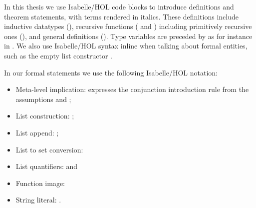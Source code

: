 \documentclass[class=smolathesis,crop=false]{standalone}
\begin{document}
In this thesis we use Isabelle/HOL code blocks to introduce definitions and theorem statements, with terms rendered in italics.
These definitions include inductive datatypes (), recursive functions ( and ) including primitively recursive ones (), and general definitions ().
Type variables are preceded by \isa{\isacharprime} as for instance in .
We also use Isabelle/HOL syntax inline when talking about formal entities, such as the empty list constructor .

In our formal statements we use the following Isabelle/HOL notation:
\begin{itemize}
  \item Meta-level implication:  expresses the conjunction introduction rule from the assumptions  and ;
  \item List construction: ;
  \item List append: ;
  \item List to set conversion: 
  \item List quantifiers:  and\\
  \item Function image: 
  \item String literal: .
\end{itemize}
\end{document}
